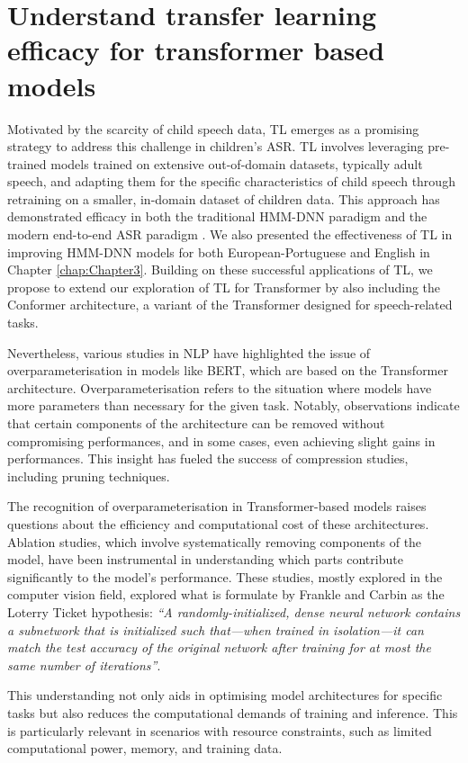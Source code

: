 \section{Understand transfer learning efficacy for transformer based models}
Motivated by the scarcity of child speech data, TL emerges as a promising strategy to address this challenge in children's ASR. TL involves leveraging pre-trained models trained on extensive out-of-domain datasets, typically adult speech, and adapting them for the specific characteristics of child speech through retraining on a smaller, in-domain dataset of children data. This approach has demonstrated efficacy in both the traditional HMM-DNN paradigm and the modern end-to-end ASR paradigm \cite{sri_end2end,gelin2021endtoend}. We also presented the effectiveness of TL in improving HMM-DNN models for both European-Portuguese and English in Chapter \ref{chap:Chapter3}. Building on these successful applications of TL, we propose to extend our exploration of TL for Transformer by also including the Conformer architecture, a variant of the Transformer designed for speech-related tasks.

Nevertheless, various studies in NLP have highlighted the issue of overparameterisation in models like BERT, which are based on the Transformer architecture. Overparameterisation refers to the situation where models have more parameters than necessary for the given task. Notably, observations indicate that certain components of the architecture can be removed without compromising performances, and in some cases, even achieving slight gains in performances. This insight has fueled the success of compression studies, including pruning techniques.

The recognition of overparameterisation in Transformer-based models raises questions about the efficiency and computational cost of these architectures. Ablation studies, which involve systematically removing components of the model, have been instrumental in understanding which parts contribute significantly to the model's performance. These studies, mostly explored in the computer vision field, explored what is formulate by Frankle and Carbin as the Loterry Ticket hypothesis: \textit{``A randomly-initialized, dense neural network contains a subnetwork that is initialized such that—when trained in isolation—it can match the test accuracy of the original network after training for at most the same number of iterations''}.

This understanding not only aids in optimising model architectures for specific tasks but also reduces the computational demands of training and inference. This is particularly relevant in scenarios with resource constraints, such as limited computational power, memory, and training data.

